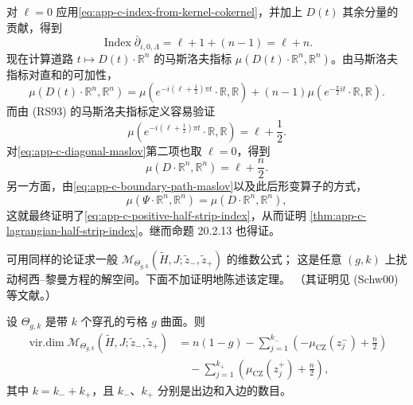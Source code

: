 对 $\ell=0$ 应用\eqref{eq:app-c-index-from-kernel-cokernel}，并加上 $D(t)$ 其余分量的
贡献，得到
\begin{equation}
\label{eq:app-c-direct-sum-index}
 \operatorname{Index}\bar\partial_{i,0,\Lambda}
 =\ell+1+(n-1)=\ell+n.
\end{equation}
现在计算道路 $t\mapsto D(t)\cdot\mathbb R^n$ 的马斯洛夫指标
$\mu(D(t)\cdot\mathbb R^n,\mathbb R^n)$。由马斯洛夫指标对直和的可加性，
\begin{equation}
\label{eq:app-c-diagonal-maslov}
 \mu(D(t)\cdot\mathbb R^n,\mathbb R^n)
 =\mu(e^{-i(\ell+\frac12)\pi t}\cdot\mathbb R,\mathbb R)
 +(n-1)\mu(e^{-\frac\pi2it}\cdot\mathbb R,\mathbb R).
\end{equation}
而由 (RS93) 的马斯洛夫指标定义容易验证
\[
 \mu(e^{-i(\ell+\frac12)\pi t}\cdot\mathbb R,\mathbb R)
 =\ell+\frac12.
\]
对\eqref{eq:app-c-diagonal-maslov}第二项也取 $\ell=0$，得到
\[
 \mu(D\cdot\mathbb R^n,\mathbb R^n)=\ell+\frac n2.
\]
另一方面，由\eqref{eq:app-c-boundary-path-maslov}以及此后形变算子的方式，
\[
 \mu(\Psi\cdot\mathbb R^n,\mathbb R^n)
 =\mu(D\cdot\mathbb R^n,\mathbb R^n),
\]
这就最终证明了\eqref{eq:app-c-positive-half-strip-index}，从而证明
\cref{thm:app-c-lagrangian-half-strip-index}。继而命题 20.2.13 也得证。

可用同样的论证求一般
$\mathcal M_{\Theta_{g,k}}(\widetilde H,J;\widetilde z_-,\widetilde z_+)$ 的维数公式；
这是任意 $(g,k)$ 上扰动柯西--黎曼方程的解空间。下面不加证明地陈述该定理。
（其证明见 (Schw00) 等文献。）

\begin{theorem}
\label{thm:app-c-general-punctured-index}
设 $\Theta_{g,k}$ 是带 $k$ 个穿孔的亏格 $g$ 曲面。则
\begin{align*}
 \operatorname{vir.dim}
 \mathcal M_{\Theta_{g,k}}
 (\widetilde H,J;\widetilde z_-,\widetilde z_+)
 &=n(1-g)-\sum_{j=1}^{k_-}
   \left(-\mu_{\mathrm{CZ}}(z_j^-)+\frac n2\right)\\
 &\quad-\sum_{j=1}^{k_+}
   \left(\mu_{\mathrm{CZ}}(z_j^+)+\frac n2\right),
\end{align*}
其中 $k=k_-+k_+$，且 $k_-$、$k_+$ 分别是出边和入边的数目。
\end{theorem}
